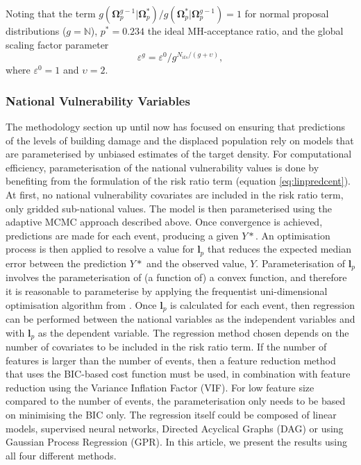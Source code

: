 \documentclass[10pt,a4paper]{article}
\begin{document}
\begin{multicols}{1}
Noting that the term $g\left(\boldsymbol{\Omega}_p^{g-1}|\boldsymbol{\Omega}_p^{*}\right)/g\left(\boldsymbol{\Omega}_p^{*}|\boldsymbol{\Omega}_p^{g-1}\right)=1$ for normal proposal distributions ($g=\mathbb{N}$), $p^*=0.234$ the ideal MH-acceptance ratio, and the global scaling factor parameter
\begin{equation}
  \varepsilon^g=\varepsilon^0/g^{N_{its}/(g+\upsilon)},
\end{equation}
where $\varepsilon^0=1$ and $\upsilon=2$.
\subsubsection{National Vulnerability Variables}\label{sec:vulnmethod}
The methodology section up until now has focused on ensuring that predictions of the levels of building damage and the displaced population rely on models that are parameterised by unbiased estimates of the target density. For computational efficiency, parameterisation of the national vulnerability values is done by benefiting from the formulation of the risk ratio term (equation \ref{eq:linpredcent}). At first, no national vulnerability covariates are included in the risk ratio term, only gridded sub-national values. The model is then parameterised using the adaptive MCMC approach described above. Once convergence is achieved, predictions are made for each event, producing a given $Y*$. An optimisation process is then applied to resolve a value for $\boldsymbol{l}_p$ that reduces the expected median error between the prediction $Y*$ and the observed value, $Y$. Parameterisation of $\boldsymbol{l}_p$ involves the parameterisation of (a function of) a convex function, and therefore it is reasonable to parameterise by applying the frequentist uni-dimensional optimisation algorithm from \cite{Jorge Nocedal and Stephen J. Wright, 1999. Numerical optimization. Springer series in operations research. Springer-Verlag, New York, NY, USA}. Once $\boldsymbol{l}_p$ is calculated for each event, then regression can be performed between the national variables as the independent variables and with $\boldsymbol{l}_p$ as the dependent variable. The regression method chosen depends on the number of covariates to be included in the risk ratio term. If the number of features is larger than the number of events, then a feature reduction method that uses the BIC-based cost function must be used, in combination with feature reduction using the Variance Inflation Factor (VIF). For low feature size compared to the number of events, the parameterisation only needs to be based on minimising the BIC only. The regression itself could be composed of linear models, supervised neural networks, Directed Acyclical Graphs (DAG) or using Gaussian Process Regression (GPR). In this article, we present the results using all four different methods.


\end{multicols}
\end{document}
